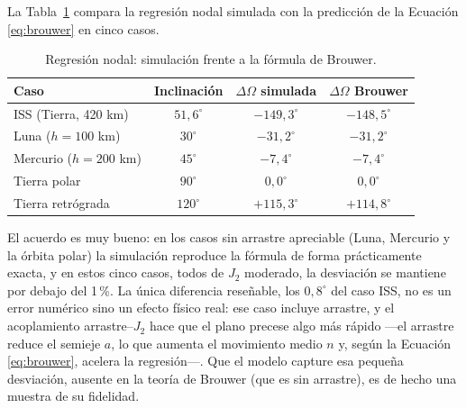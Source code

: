 La Tabla~\ref{tab:brouwer} compara la regresión nodal simulada con la predicción de la Ecuación \ref{eq:brouwer} en cinco casos.

\begin{table}[htbp]
  \centering
  \caption{Regresión nodal: simulación frente a la fórmula de Brouwer.}
  \label{tab:brouwer}
  \begin{tabular}{l c c c}
    \hline
    \textbf{Caso} & \textbf{Inclinación} & \textbf{$\Delta\Omega$ simulada} & \textbf{$\Delta\Omega$ Brouwer} \\
    \hline
    \gls{ISS} (Tierra, 420 km)  & $51{,}6^\circ$ & $-149{,}3^\circ$ & $-148{,}5^\circ$ \\
    Luna ($h=100$ km)     & $30^\circ$     & $-31{,}2^\circ$  & $-31{,}2^\circ$  \\
    Mercurio ($h=200$ km) & $45^\circ$     & $-7{,}4^\circ$   & $-7{,}4^\circ$   \\
    Tierra polar          & $90^\circ$     & $0{,}0^\circ$    & $0{,}0^\circ$    \\
    Tierra retrógrada     & $120^\circ$    & $+115{,}3^\circ$ & $+114{,}8^\circ$ \\
    \hline
  \end{tabular}
\end{table}

El acuerdo es muy bueno: en los casos sin arrastre apreciable (Luna, Mercurio y la órbita polar) la simulación reproduce la fórmula de forma prácticamente exacta, y en estos cinco casos, todos de $J_2$ moderado, la desviación se mantiene por debajo del 1\,\%. La única diferencia reseñable, los $0{,}8^\circ$ del caso \gls{ISS}, no es un error numérico sino un efecto físico real: ese caso incluye arrastre, y el acoplamiento arrastre--$J_2$ hace que el plano precese algo más rápido ---el arrastre reduce el semieje $a$, lo que aumenta el movimiento medio $n$ y, según la Ecuación \ref{eq:brouwer}, acelera la regresión---. Que el modelo capture esa pequeña desviación, ausente en la teoría de Brouwer (que es sin arrastre), es de hecho una muestra de su fidelidad.

